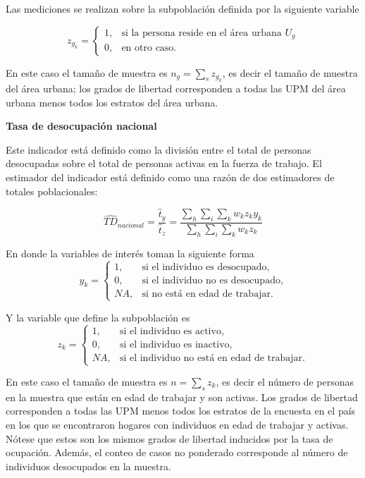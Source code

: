\documentclass[12pt,spanish,]{book}
\begin{document}
Las mediciones se realizan sobre la subpoblación definida por la siguiente variable

\[
z_{g_k}=
\begin{cases}
1, &\text{si la persona reside en el área urbana $U_g$}\\
0, &\text{en otro caso.}
\end{cases}
\]

En este caso el tamaño de muestra es \(n_g = \sum_s z_{g_k}\), es decir el tamaño de muestra del área urbana; los grados de libertad corresponden a todas las UPM del área urbana menos todos los estratos del área urbana.

\textbf{Tasa de desocupación nacional}

Este indicador está definido como la división entre el total de personas desocupadas sobre el total de personas activas en la fuerza de trabajo. El estimador del indicador está definido como una razón de dos estimadores de totales poblacionales:

\[
\widehat{TD}_{nacional} =  \frac{\hat t_y}{\hat t_z} =\frac{\sum_h\sum_i\sum_k w_kz_{k}y_{k}}{\sum_h\sum_i\sum_k w_kz_{k}}
\]

En donde la variables de interés toman la siguiente forma
\[
y_{k}=
\begin{cases}
1, &\text{si el individuo es desocupado,}\\
0, &\text{si el individuo no es desocupado,}\\
NA, &\text{si no está en edad de trabajar.}
\end{cases}
\]

Y la variable que define la subpoblación es
\[
z_{k}=
\begin{cases}
1, &\text{si el individuo es activo,}\\
0, &\text{si el individuo es inactivo,}\\
NA, &\text{si el individuo no está en edad de trabajar.}
\end{cases}
\]

En este caso el tamaño de muestra es \(n = \sum_s z_{k}\), es decir el número de personas en la muestra que están en edad de trabajar y son activas. Los grados de libertad corresponden a todas las UPM menos todos los estratos de la encuesta en el país en los que se encontraron hogares con individuos en edad de trabajar y activas. Nótese que estos son los mismos grados de libertad inducidos por la tasa de ocupación. Además, el conteo de casos no ponderado corresponde al número de individuos desocupados en la muestra.
\end{document}
